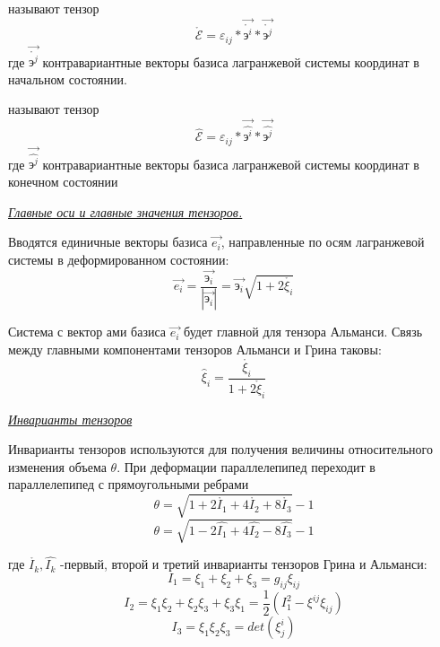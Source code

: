  называют тензор $$\mathring{\mathcal{E}}=\varepsilon_{ij}*\overrightarrow{\mathring{\text{э}^i}}*\overrightarrow{\mathring{\text{э}^j}}$$ где $\overrightarrow{\mathring{\text{э}^j}}$ контравариантные векторы базиса лагранжевой системы координат в начальном состоянии.

 называют тензор $$\hat{\mathcal{E}}=\varepsilon_{ij}*\overrightarrow{\hat{\text{э}^i}}*\overrightarrow{\hat{\text{э}^j}}$$ где $\overrightarrow{\hat{\text{э}^j}}$ контравариантные векторы базиса лагранжевой системы координат в конечном состоянии


\begin{center}
  \textit{\underline{Главные оси и главные значения тензоров.}}
\end{center}

Вводятся единичные векторы базиса $\overrightarrow{e_i}$, направленные по осям лагранжевой системы в деформированном состоянии:
$$\overrightarrow{e_i}=\frac{\overrightarrow{\text{э}_{i}}}{|\overrightarrow{\text{э}_{i}}|}=\overrightarrow{\text{э}_{i}}\sqrt{1+2\mathring{\xi_i}}$$

Система с вектор ами базиса $\overrightarrow{e_i}$ будет главной для тензора Альманси.
Связь между главными компонентами тензоров Альманси и Грина таковы:
$$\hat\xi_i=\frac{\mathring{\xi_i}}{1+2\mathring\xi_i}$$

\begin{center}
  \textit{\underline{Инварианты тензоров}}
\end{center}
Инварианты тензоров используются для получения величины относительного изменения объема $\theta$.
При деформации параллелепипед переходит в параллелепипед с прямоугольными ребрами
$$\theta=\sqrt{1+2\mathring{I_1}+4\mathring{I_2}+8\mathring{I_3}}-1$$
$$\theta=\sqrt{1-2\hat{I_1}+4\hat{I_2}-8\hat{I_3}}-1$$

где $\mathring{I_k},\hat{I_k}$ -первый, второй и третий инварианты тензоров Грина и Альманси:
$$I_1=\xi_1+\xi_2+\xi_3=g_{ij}\xi_{ij}$$
$$I_2=\xi_1\xi_2+\xi_2\xi_3+\xi_3\xi_1=\frac{1}{2}(I_1^2-\xi^{ij}\xi_{ij})$$
$$I_3=\xi_1\xi_2\xi_3=det(\xi_j^i)$$
